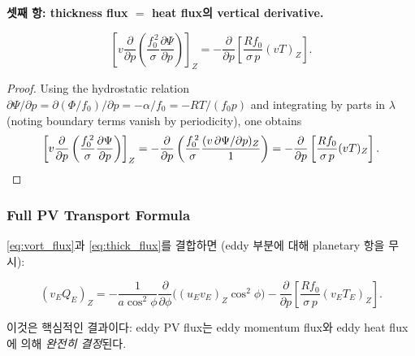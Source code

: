 \noindent\textbf{셋째 항: thickness flux $=$ heat flux의 vertical derivative.}

\begin{proposition}
\begin{equation}\label{eq:thick_flux}
  \left[v\frac{\partial}{\partial p}
    \left(\frac{f_0^{\,2}}{\sigma}\frac{\partial\Psi}{\partial p}\right)\right]_Z
  = -\frac{\partial}{\partial p}
    \left[\frac{Rf_0}{\sigma\,p}(vT)_Z\right].
\end{equation}
\end{proposition}

\begin{proof}
Using the hydrostatic relation $\partial\Psi/\partial p = \partial(\Phi/f_0)/\partial p = -\alpha/f_0 = -RT/(f_0 p)$
and integrating by parts in $\lambda$ (noting boundary terms vanish by
periodicity), one obtains
\[
  \left[v\frac{\partial}{\partial p}
    \left(\frac{f_0^{\,2}}{\sigma}\frac{\partial\Psi}{\partial p}\right)\right]_Z
  = -\frac{\partial}{\partial p}
    \left(\frac{f_0^{\,2}}{\sigma}\frac{(v\,\partial\Psi/\partial p)_Z}{1}\right)
  = -\frac{\partial}{\partial p}
    \left[\frac{Rf_0}{\sigma\,p}(vT)_Z\right].\qedhere
\]
\end{proof}


\subsubsection{Full PV Transport Formula}

\eqref{eq:vort_flux}과 \eqref{eq:thick_flux}를 결합하면 (eddy 부분에 대해
planetary 항을 무시):

\begin{equation}\label{eq:vQ_full}
  \boxed{
  (v_E Q_E)_Z
  = -\frac{1}{a\cos^2\phi}\frac{\partial}{\partial\phi}
    \bigl((u_E v_E)_Z\cos^2\phi\bigr)
  - \frac{\partial}{\partial p}
    \left[\frac{Rf_0}{\sigma\,p}(v_E T_E)_Z\right].
  }
\end{equation}

\begin{remark}
이것은 핵심적인 결과이다: eddy PV flux는 eddy momentum flux와
eddy heat flux에 의해 \textit{완전히 결정}된다.
\end{remark}

